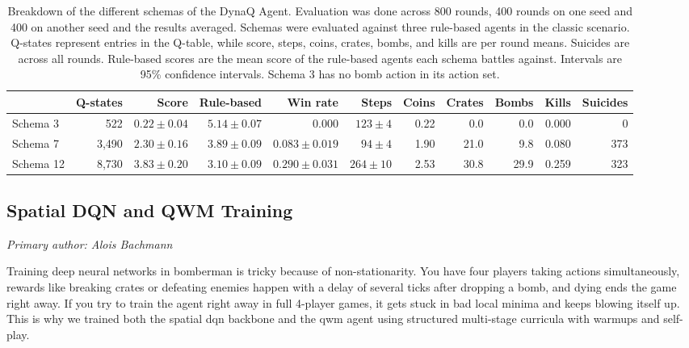 \documentclass[article, 10pt]{IEEEtran}
\begin{document}
\begin{table}[t]
  \centering \small
  \caption{Breakdown of the different schemas of the DynaQ Agent. Evaluation was done across 800 rounds, 400 rounds on one seed and 400 on another seed and the results averaged. Schemas were evaluated against three rule-based agents in the classic scenario. Q-states represent entries in the Q-table, while score, steps, coins, crates, bombs, and kills are per round means. Suicides are across all rounds. Rule-based scores are the mean score of the rule-based agents each schema battles against. Intervals are 95\% confidence intervals. Schema 3 has no bomb action in its action set.}
  \label{tab:DynaQ Schema Comparison}
  \begin{tabular}{lrrrrrrrrrr}
    \toprule
    & Q-states & Score & Rule-based & Win rate & Steps & Coins & Crates & Bombs & Kills & Suicides \\
    \midrule
    Schema 3  & 522     & $0.22 \pm 0.04$ & $5.14 \pm 0.07$ & $0.000$           & $123 \pm 4$  & 0.22 & 0.0  & 0.0  & 0.000 & 0   \\
    Schema 7  & 3{,}490 & $2.30 \pm 0.16$ & $3.89 \pm 0.09$ & $0.083 \pm 0.019$ & $94 \pm 4$   & 1.90 & 21.0 & 9.8  & 0.080 & 373 \\
    Schema 12 & 8{,}730 & $3.83 \pm 0.20$ & $3.10 \pm 0.09$ & $0.290 \pm 0.031$ & $264 \pm 10$ & 2.53 & 30.8 & 29.9 & 0.259 & 323 \\
    \bottomrule
  \end{tabular}
\end{table}

\subsection{Spatial DQN and QWM Training}\label{subsec:qwm_training}

\textit{Primary author: Alois Bachmann}

Training deep neural networks in bomberman is tricky because of non-stationarity. You have four players taking actions simultaneously, rewards like breaking crates or defeating enemies happen with a delay of several ticks after dropping a bomb, and dying ends the game right away. If you try to train the agent right away in full 4-player games, it gets stuck in bad local minima and keeps blowing itself up. This is why we trained both the spatial dqn backbone and the qwm agent using structured multi-stage curricula with warmups and self-play.
\end{document}

